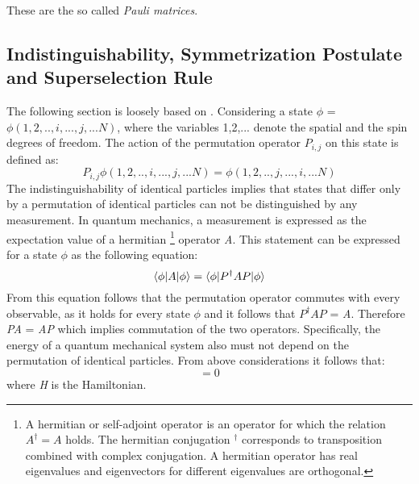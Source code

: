 These are the so called \textit{Pauli matrices}.

\subsection{Indistinguishability, Symmetrization Postulate and Superselection Rule}
\label{sec:IndSymPostSS}


The following section is loosely based on \cite{Sperandio2008}. Considering a state $\phi$ = $\phi(1,2,..,i,...,j,...N)$, where the variables 1,2,... denote the spatial and the spin degrees of freedom. The action of the permutation operator $P_{i,j}$ on this state is defined as:
\begin{equation}
 P_{i,j}\phi(1,2,..,i,...,j,...N) = \phi(1,2,..,j,...,i,...N)
\end{equation} 
The indistinguishability of identical particles implies that states that differ only by a permutation of identical particles can not be distinguished by any measurement. In quantum mechanics, a measurement is expressed as the expectation value of a hermitian \footnote{A hermitian or self-adjoint operator is an operator for which the relation $A^{\dag} = A$ holds. The hermitian conjugation $^{\dag}$ corresponds to transposition combined with complex conjugation. A hermitian operator has real eigenvalues and eigenvectors for different eigenvalues are orthogonal.} operator \textit{A}. This statement can be expressed for a state $\phi$ as the following equation:
\begin{equation}
 \braket{\phi|A|\phi} = \braket{\phi|P^{\dag}AP|\phi}
\end{equation} 
From this equation follows that the permutation operator commutes with every observable, as it holds for every state $\phi$ and it follows that $P^{\dag}AP$ = \textit{A}. Therefore \textit{PA} = \textit{AP} which implies commutation of the two operators. Specifically, the energy of a quantum mechanical system also must not depend on the permutation of identical particles. From above considerations it follows that:
\begin{equation}
 [P,H] = 0
\end{equation} 
where \textit{H} is the Hamiltonian. 

